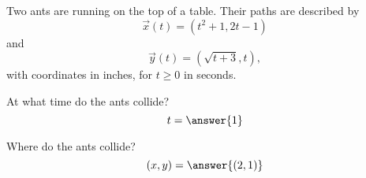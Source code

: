 \begin{problem}
Two ants are running on the top of a table. Their paths are described by
\[
\vec{x}(t) = (t^2+1,2t-1)
\]
and
\[
\vec{y}(t) = (\sqrt{t+3}, t),
\]
with coordinates in inches, for $t\geq 0$ in seconds.

At what time do the ants collide?
\[
t = \answer{1}
\]

Where do the ants collide?
\[
(x,y) = \answer{(2,1)}
\]

\end{problem}